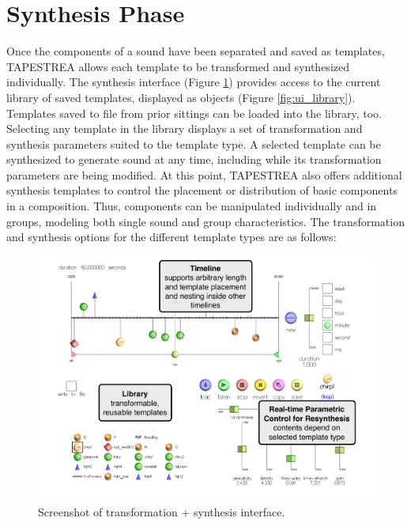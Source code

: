\documentclass[10pt,letterpaper]{article}
\begin{document}
\section{Synthesis Phase}

Once the components of a sound have been separated and saved as
templates, TAPESTREA allows each template to be transformed and
synthesized individually. The synthesis interface (Figure
\ref{fig:ui_synthesis}) provides access to the current library of saved
templates, displayed as objects (Figure \ref{fig:ui_library}). Templates
saved to file from prior sittings can be loaded into the library, too.
Selecting any template in the library displays a set of transformation
and synthesis parameters suited to the template type. A selected
template can be synthesized to generate sound at any time, including
while its transformation parameters are being modified. At this point,
TAPESTREA also offers additional synthesis templates to control the
placement or distribution of basic components in a composition. Thus,
components can be manipulated individually and in groups, modeling both
single sound and group characteristics. The transformation and synthesis
options for the different template types are as follows:

\begin{figure}[h]
  \begin{center}
    \includegraphics[width=1\columnwidth]{ui_synthesis.pdf}
    \caption{Screenshot of transformation + synthesis interface.}  
    \label{fig:ui_synthesis}
  \end{center}
\end{figure}
\end{document}
